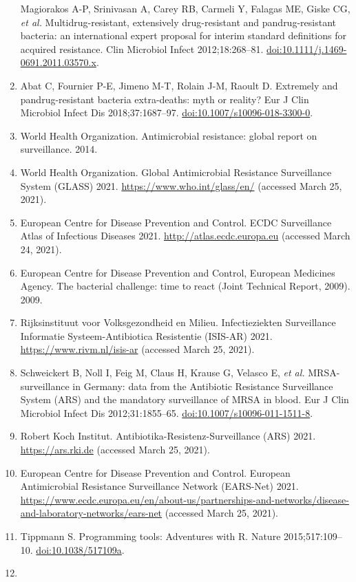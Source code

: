 \documentclass[
]{book}
\begin{document}
\begin{enumerate}
  Magiorakos A-P, Srinivasan A, Carey RB, Carmeli Y, Falagas ME, Giske CG, \emph{et al.} Multidrug-resistant, extensively drug-resistant and pandrug-resistant bacteria: an international expert proposal for interim standard definitions for acquired resistance. Clin Microbiol Infect 2012;18:268--81. \url{doi:10.1111/j.1469-0691.2011.03570.x}.
\item
  Abat C, Fournier P-E, Jimeno M-T, Rolain J-M, Raoult D. Extremely and pandrug-resistant bacteria extra-deaths: myth or reality? Eur J Clin Microbiol Infect Dis 2018;37:1687--97. \url{doi:10.1007/s10096-018-3300-0}.
\item
  World Health Organization. Antimicrobial resistance: global report on surveillance. 2014.
\item
  World Health Organization. Global Antimicrobial Resistance Surveillance System (GLASS) 2021. \url{https://www.who.int/glass/en/} (accessed March 25, 2021).
\item
  European Centre for Disease Prevention and Control. ECDC Surveillance Atlas of Infectious Diseases 2021. \url{http://atlas.ecdc.europa.eu} (accessed March 24, 2021).
\item
  European Centre for Disease Prevention and Control, European Medicines Agency. The bacterial challenge: time to react (Joint Technical Report, 2009). 2009.
\item
  Rijksinstituut voor Volksgezondheid en Milieu. Infectieziekten Surveillance Informatie Systeem-Antibiotica Resistentie (ISIS-AR) 2021. \url{https://www.rivm.nl/isis-ar} (accessed March 25, 2021).
\item
  Schweickert B, Noll I, Feig M, Claus H, Krause G, Velasco E, \emph{et al.} MRSA-surveillance in Germany: data from the Antibiotic Resistance Surveillance System (ARS) and the mandatory surveillance of MRSA in blood. Eur J Clin Microbiol Infect Dis 2012;31:1855--65. \url{doi:10.1007/s10096-011-1511-8}.
\item
  Robert Koch Institut. Antibiotika-Resistenz-Surveillance (ARS) 2021. \url{https://ars.rki.de} (accessed March 25, 2021).
\item
  European Centre for Disease Prevention and Control. European Antimicrobial Resistance Surveillance Network (EARS-Net) 2021. \url{https://www.ecdc.europa.eu/en/about-us/partnerships-and-networks/disease-and-laboratory-networks/ears-net} (accessed March 25, 2021).
\item
  Tippmann S. Programming tools: Adventures with R. Nature 2015;517:109--10. \url{doi:10.1038/517109a}.
\item

\end{enumerate}
\end{document}
